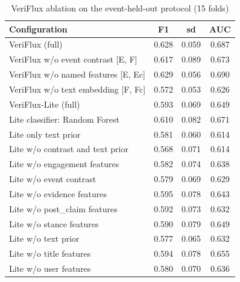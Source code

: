 \begin{table}[t]
\centering
\caption{VeriFlux ablation on the event-held-out protocol (15 folds)}
\label{tab:ablation}
\footnotesize
\begin{tabular}{lccc}
\toprule
Configuration & F1 & sd & AUC\\
\midrule
VeriFlux (full) & 0.628 & 0.059 & 0.687\\
VeriFlux w/o event contrast [E, F] & 0.617 & 0.089 & 0.673\\
VeriFlux w/o named features [E, Ec] & 0.629 & 0.056 & 0.690\\
VeriFlux w/o text embedding [F, Fc] & 0.572 & 0.053 & 0.626\\
VeriFlux-Lite (full) & 0.593 & 0.069 & 0.649\\
Lite classifier: Random Forest & 0.610 & 0.082 & 0.671\\
Lite only text prior & 0.581 & 0.060 & 0.614\\
Lite w/o contrast and text prior & 0.568 & 0.071 & 0.614\\
Lite w/o engagement features & 0.582 & 0.074 & 0.638\\
Lite w/o event contrast & 0.579 & 0.069 & 0.629\\
Lite w/o evidence features & 0.595 & 0.078 & 0.643\\
Lite w/o post\_claim features & 0.592 & 0.073 & 0.632\\
Lite w/o stance features & 0.590 & 0.079 & 0.649\\
Lite w/o text prior & 0.577 & 0.065 & 0.632\\
Lite w/o title features & 0.594 & 0.078 & 0.655\\
Lite w/o user features & 0.580 & 0.070 & 0.636\\
\bottomrule
\end{tabular}
\end{table}
